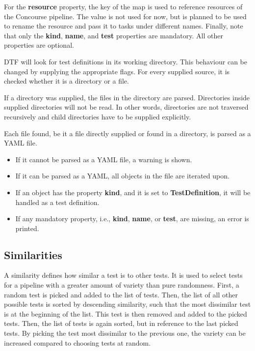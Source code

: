 For the \textbf{resource} property, the key of the map is used to reference resources of the Concourse pipeline.
The value is not used for now, but is planned to be used to rename the resource and pass it to tasks under different names.
Finally, note that only the \textbf{kind}, \textbf{name}, and \textbf{test} properties are mandatory.
All other properties are optional.

DTF will look for test definitions in its working directory.
This behaviour can be changed by supplying the appropriate flags.
For every supplied source, it is checked whether it is a directory or a file.

If a directory was supplied, the files in the directory are parsed.
Directories inside supplied directories will not be read.
In other words, directories are not traversed recursively and child directories have to be supplied explicitly.

Each file found, be it a file directly supplied or found in a directory, is parsed as a YAML file.
\begin{itemize}
  \item If it cannot be parsed as a YAML file, a warning is shown.
  \item If it can be parsed as a YAML, all objects in the file are iterated upon.
  \item If an object has the property \textbf{kind}, and it is set to \textbf{TestDefinition}, it will be handled as a test definition.
  \item If any mandatory property, i.e., \textbf{kind}, \textbf{name}, or \textbf{test}, are missing, an error is printed.
\end{itemize}

\subsection{Similarities}\label{subsec:similarities}

A similarity defines how similar a test is to other tests.
It is used to select tests for a pipeline with a greater amount of variety than pure randomness.
First, a random test is picked and added to the list of tests.
Then, the list of all other possible tests is sorted by descending similarity, such that the most dissimilar test is at the beginning of the list.
This test is then removed and added to the picked tests.
Then, the list of tests is again sorted, but in reference to the last picked tests.
By picking the test most dissimilar to the previous one, the variety can be increased compared to choosing tests at random.

